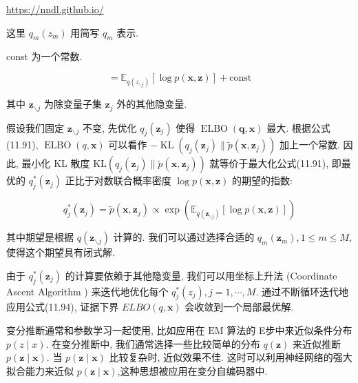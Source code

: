 \documentclass[10pt]{article}
\begin{document}
\href{https://nndl.github.io/}{https://nndl.github.io/}

这里 $q_{m}\left(z_{m}\right)$ 用简写 $q_{m}$ 表示.

const 为一个常数.


\begin{equation*}
=\mathbb{E}_{q\left(z_{\backslash j}\right)}[\log p(\boldsymbol{x}, \boldsymbol{z})]+\mathrm{const} \tag{11.93}
\end{equation*}


其中 $\boldsymbol{z}_{\backslash j}$ 为除变量子集 $\boldsymbol{z}_{j}$ 外的其他隐变量.

假设我们固定 $\boldsymbol{z}_{\backslash j}$ 不变, 先优化 $q_{j}\left(\boldsymbol{z}_{j}\right)$ 使得 $\operatorname{ELBO}(\boldsymbol{q}, \boldsymbol{x})$ 最大. 根据公式(11.91), $\operatorname{ELBO}(q, \boldsymbol{x})$ 可以看作 $-\operatorname{KL}\left(q_{j}\left(\boldsymbol{z}_{j}\right) \| \tilde{p}\left(\boldsymbol{x}, \boldsymbol{z}_{j}\right)\right)$ 加上一个常数. 因此, 最小化 KL 散度 $\mathrm{KL}\left(q_{j}\left(\boldsymbol{z}_{j}\right) \| \tilde{p}\left(\boldsymbol{x}, \boldsymbol{z}_{j}\right)\right)$ 就等价于最大化公式(11.91), 即最优的 $q_{j}^{*}\left(\boldsymbol{z}_{j}\right)$ 正比于对数联合概率密度 $\log p(\boldsymbol{x}, \boldsymbol{z})$ 的期望的指数:


\begin{equation*}
q_{j}^{*}\left(\boldsymbol{z}_{j}\right)=\tilde{p}\left(\boldsymbol{x}, \boldsymbol{z}_{j}\right) \propto \exp \left(\mathbb{E}_{q\left(\boldsymbol{z}_{\backslash j}\right)}[\log p(\boldsymbol{x}, \boldsymbol{z})]\right) \tag{11.94}
\end{equation*}


其中期望是根据 $q\left(\boldsymbol{z}_{\backslash j}\right)$ 计算的. 我们可以通过选择合适的 $q_{m}\left(\boldsymbol{z}_{m}\right), 1 \leq m \leq M$,使得这个期望具有闭式解.

由于 $q_{j}^{*}\left(\boldsymbol{z}_{j}\right)$ 的计算要依赖于其他隐变量, 我们可以用坐标上升法 (Coordinate Ascent Algorithm ) 来迭代地优化每个 $q_{j}^{*}\left(z_{j}\right), j=1, \cdots, M$. 通过不断循环迭代地应用公式(11.94), 证据下界 $E L B O(q, \boldsymbol{x})$ 会收敛到一个局部最优解.

变分推断通常和参数学习一起使用, 比如应用在 $\mathrm{EM}$ 算法的 E步中来近似条件分布 $p(z \mid x)$. 在变分推断中, 我们通常选择一些比较简单的分布 $q(\boldsymbol{z})$ 来近似推断 $p(\boldsymbol{z} \mid \boldsymbol{x})$. 当 $p(\boldsymbol{z} \mid \boldsymbol{x})$ 比较复杂时, 近似效果不佳. 这时可以利用神经网络的强大拟合能力来近似 $p(\boldsymbol{z} \mid \boldsymbol{x})$,这种思想被应用在变分自编码器中.
\end{document}
